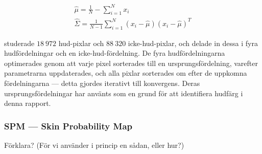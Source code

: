 \documentclass[../rapport_MVEX01-11-05]{subfiles}
\begin{document}

\begin{gather*}
  \hat\mu    =\frac{1}{N}-\sum_{i=1}^Nx_i\\
  \hat\Sigma =\frac{1}{N-1}\sum_{i=1}^N(x_i-\hat\mu)(x_i-\hat\mu)^T
\end{gather*}

 studerade $18\:972$
hud-pixlar och $88\:320$ icke-hud-pixlar, och delade in dessa i fyra
hudfördelningar och en icke-hud-fördelning. De fyra hudfördelningarna
optimerades genom att varje pixel sorterades till en
ursprungsfördelning, varefter parametrarna uppdaterades, och alla
pixlar sorterades om efter de uppkomna fördelningarna --- detta gjordes
iterativt till konvergens. Deras ursprungsfördelningar har använts
som en grund för att identifiera hudfärg i denna rapport.


\subsubsection{SPM --- Skin Probability Map}

Förklara? (För vi använder i princip en sådan, eller hur?)
\end{document}
